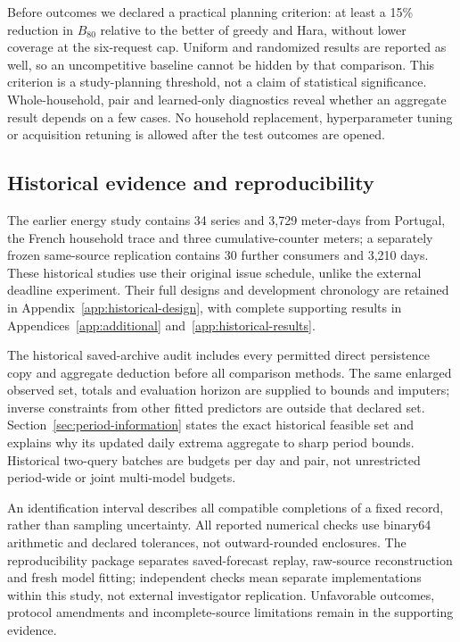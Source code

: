 \documentclass[12pt]{article}
\begin{document}
Before outcomes we declared a practical planning criterion: at least a
15\% reduction in $B_{80}$ relative to the better of greedy and Hara, without
lower coverage at the six-request cap. Uniform and randomized results are
reported as well, so an uncompetitive baseline cannot be hidden by that
comparison. This criterion is a study-planning threshold, not a claim of
statistical significance. Whole-household,
pair and learned-only diagnostics reveal whether an aggregate result depends
on a few cases. No household replacement, hyperparameter tuning or acquisition
retuning is allowed after the test outcomes are opened.

\subsection{Historical evidence and reproducibility}
The earlier energy study contains 34 series and 3,729 meter-days from Portugal,
the French household trace and three cumulative-counter meters; a separately
frozen same-source replication contains 30 further consumers and 3,210 days.
These historical studies use their original issue schedule, unlike the
external deadline experiment. Their full designs and development chronology
are retained in Appendix~\ref{app:historical-design}, with complete supporting
results in Appendices~\ref{app:additional} and~\ref{app:historical-results}.

The historical saved-archive audit includes every permitted direct
persistence copy and aggregate deduction before all comparison methods.
The same enlarged observed set, totals and evaluation horizon are supplied
to bounds and imputers; inverse constraints from other fitted predictors
are outside that declared set. Section~\ref{sec:period-information} states
the exact historical feasible set and explains why its updated daily extrema
aggregate to sharp period bounds. Historical two-query batches are budgets
per day and pair, not unrestricted period-wide or joint multi-model budgets.

An identification interval describes all compatible completions of a fixed
record, rather than sampling uncertainty. All reported numerical checks use
binary64 arithmetic and declared tolerances, not outward-rounded enclosures.
The reproducibility package separates saved-forecast replay, raw-source
reconstruction and fresh model fitting; independent checks mean separate
implementations within this study, not external investigator replication.
Unfavorable outcomes, protocol amendments and incomplete-source limitations
remain in the supporting evidence.
\end{document}
